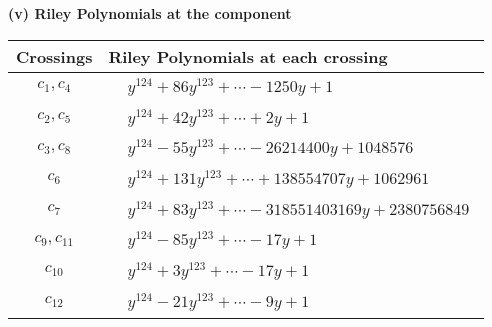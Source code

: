 \documentclass[1p]{elsarticle_modified}
\theoremstyle{definition}
\begin{document}
\newpage\renewcommand{\arraystretch}{1}
\flushleft \textbf{(v) Riley Polynomials at the component}\newline \\
\begin{tabular}{m{50pt}|m{274pt}}
Crossings & \hspace{64pt}Riley Polynomials at each crossing \\
\hline $$\begin{aligned}c_{1},c_{4}\end{aligned}$$&$\begin{aligned}
&y^{124}+86 y^{123}+\cdots-1250 y+1
\end{aligned}$\\
\hline $$\begin{aligned}c_{2},c_{5}\end{aligned}$$&$\begin{aligned}
&y^{124}+42 y^{123}+\cdots+2 y+1
\end{aligned}$\\
\hline $$\begin{aligned}c_{3},c_{8}\end{aligned}$$&$\begin{aligned}
&y^{124}-55 y^{123}+\cdots-26214400 y+1048576
\end{aligned}$\\
\hline $$\begin{aligned}c_{6}\end{aligned}$$&$\begin{aligned}
&y^{124}+131 y^{123}+\cdots+138554707 y+1062961
\end{aligned}$\\
\hline $$\begin{aligned}c_{7}\end{aligned}$$&$\begin{aligned}
&y^{124}+83 y^{123}+\cdots-318551403169 y+2380756849
\end{aligned}$\\
\hline $$\begin{aligned}c_{9},c_{11}\end{aligned}$$&$\begin{aligned}
&y^{124}-85 y^{123}+\cdots-17 y+1
\end{aligned}$\\
\hline $$\begin{aligned}c_{10}\end{aligned}$$&$\begin{aligned}
&y^{124}+3 y^{123}+\cdots-17 y+1
\end{aligned}$\\
\hline $$\begin{aligned}c_{12}\end{aligned}$$&$\begin{aligned}
&y^{124}-21 y^{123}+\cdots-9 y+1
\end{aligned}$\\
\hline
\end{tabular}\\~\\
\end{document}
